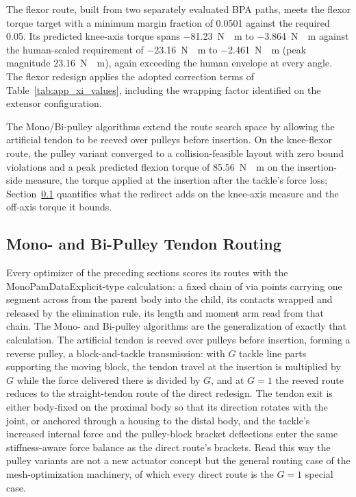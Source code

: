 The flexor route, built from two separately evaluated BPA paths, meets the flexor torque target with a minimum margin fraction of 0.0501 against the required 0.05. Its predicted knee-axis torque spans \qty{-81.23}{\newton\cdot\meter} to \qty{-3.864}{\newton\cdot\meter} against the human-scaled requirement of \qty{-23.16}{\newton\cdot\meter} to \qty{-2.461}{\newton\cdot\meter} (peak magnitude \qty{23.16}{\newton\cdot\meter}), again exceeding the human envelope at every angle. The flexor redesign applies the adopted correction terms of Table~\ref{tab:app_xi_values}, including the wrapping factor identified on the extensor configuration.

The Mono/Bi-pulley algorithms extend the route search space by allowing the artificial tendon to be reeved over pulleys before insertion. On the knee-flexor route, the pulley variant converged to a collision-feasible layout with zero bound violations and a peak predicted flexion torque of \qty{85.56}{\newton\cdot\meter} on the insertion-side measure, the torque applied at the insertion after the tackle's force loss; Section~\ref{sec:disc_pulley} quantifies what the redirect adds on the knee-axis measure and the off-axis torque it bounds.

\subsection{Mono- and Bi-Pulley Tendon Routing}\label{sec:disc_pulley}

Every optimizer of the preceding sections scores its routes with the MonoPamDataExplicit-type calculation: a fixed chain of via points carrying one segment across from the parent body into the child, its contacts wrapped and released by the elimination rule, its length and moment arm read from that chain. The Mono- and Bi-pulley algorithms are the generalization of exactly that calculation. The artificial tendon is reeved over pulleys before insertion, forming a reverse pulley, a block-and-tackle transmission: with $G$ tackle line parts supporting the moving block, the tendon travel at the insertion is multiplied by $G$ while the force delivered there is divided by $G$, and at $G = 1$ the reeved route reduces to the straight-tendon route of the direct redesign. The tendon exit is either body-fixed on the proximal body so that its direction rotates with the joint, or anchored through a housing to the distal body, and the tackle's increased internal force and the pulley-block bracket deflections enter the same stiffness-aware force balance as the direct route's brackets. Read this way the pulley variants are not a new actuator concept but the general routing case of the mesh-optimization machinery, of which every direct route is the $G = 1$ special case.

